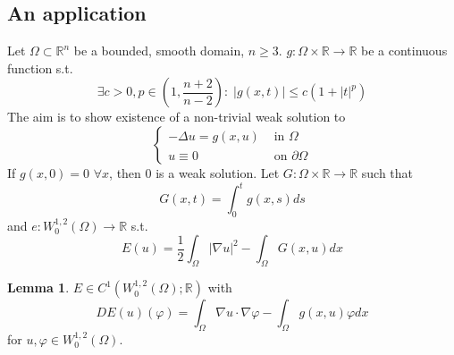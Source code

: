 \documentclass[a4paper, 12pt]{article}
\theoremstyle{plain}
\theoremstyle{definition}
\theoremstyle{lemma}
\newtheorem{lemma}[theorem]{Lemma}
\theoremstyle{remark}
\theoremstyle{corollary}
\theoremstyle{example}
\begin{document}
	\subsection{An application}
	Let $\Omega \subset \mathbb{R}^n$ be a bounded, smooth domain, $n \geq 3$. $g: \Omega \times \mathbb{R} \to \mathbb{R}$ be a continuous function s.t. \[\exists c > 0, p \in (1,\frac{n+2}{n-2}): \; \left|g(x,t)\right| \leq c (1+\left|t\right|^p)\]
	The aim is to show existence of a non-trivial weak solution to \[\begin{cases}
		-\Delta u = g(x,u) & \text{ in } \Omega\\
		u \equiv 0 & \text{ on } \partial \Omega
	\end{cases}\]
	If $g(x,0) = 0$ $\forall x$, then 0 is a weak solution.
	Let $G: \Omega\times \mathbb{R} \to \mathbb{R}$ such that \[G(x,t) = \int_0^t g(x,s) ds\] and $e: W^{1,2}_0(\Omega) \to \mathbb{R}$ s.t. \[E(u) = \frac{1}{2}\int_\Omega \left|\nabla u\right|^2 - \int_\Omega G(x,u) dx\]
	\begin{lemma}
		$E \in C^1(W^{1,2}_0(\Omega);\mathbb{R})$ with \[DE(u)(\varphi) = \int_\Omega \nabla u \cdot \nabla \varphi - \int_\Omega g(x,u)\varphi dx\] for $u,\varphi \in W^{1,2}_0(\Omega)$.
	\end{lemma}
\end{document}

